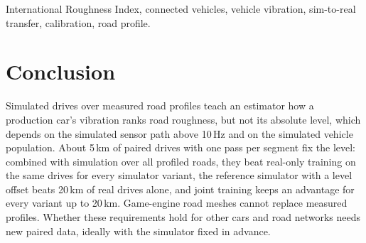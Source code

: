 \documentclass[conference]{IEEEtran}
\begin{document}
\begin{IEEEkeywords}
International Roughness Index, connected vehicles, vehicle vibration, sim-to-real transfer, calibration, road profile.
\end{IEEEkeywords}








\section{Conclusion}
\label{sec:conclusion}
Simulated drives over measured road profiles teach an estimator how a production car's vibration ranks road roughness, but not its absolute level, which depends on the simulated sensor path above 10\,Hz and on the simulated vehicle population.
About 5\,km of paired drives with one pass per segment fix the level: combined with simulation over all profiled roads, they beat real-only training on the same drives for every simulator variant, the reference simulator with a level offset beats 20\,km of real drives alone, and joint training keeps an advantage for every variant up to 20\,km.
Game-engine road meshes cannot replace measured profiles.
Whether these requirements hold for other cars and road networks needs new paired data, ideally with the simulator fixed in advance.


\end{document}
